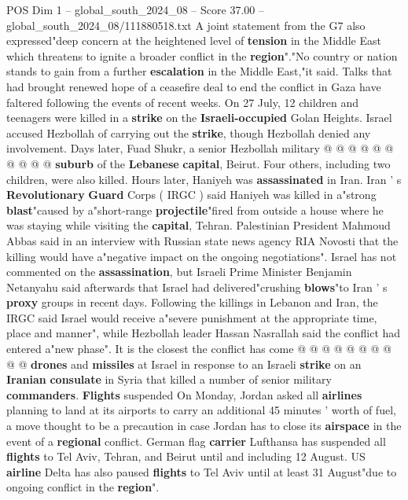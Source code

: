 \begin{textsample}{POS Dim 1 – global\_south\_2024\_08 – Score 37.00 – global\_south\_2024\_08/111880518.txt}
A joint statement from the G7 also expressed"deep concern at the heightened level of \textbf{tension} in the Middle East which threatens to ignite a broader conflict in the \textbf{region}"."No country or nation stands to gain from a further \textbf{escalation} in the Middle East,"it said.
Talks that had brought renewed hope of a ceasefire deal to end the conflict in Gaza have faltered following the events of recent weeks.
On 27 July, 12 children and teenagers were killed in a \textbf{strike} on the \textbf{Israeli-occupied} Golan Heights.
Israel accused Hezbollah of carrying out the \textbf{strike}, though Hezbollah denied any involvement.
Days later, Fuad Shukr, a senior Hezbollah military @ @ @ @ @ @ @ @ @ @ \textbf{suburb} of the \textbf{Lebanese} \textbf{capital}, Beirut.
Four others, including two children, were also killed.
Hours later, Haniyeh was \textbf{assassinated} in Iran.
Iran ' s \textbf{Revolutionary} \textbf{Guard} Corps ( IRGC ) said Haniyeh was killed in a"strong \textbf{blast}"caused by a"short-range \textbf{projectile}"fired from outside a house where he was staying while visiting the \textbf{capital}, Tehran.
Palestinian President Mahmoud Abbas said in an interview with Russian state news agency RIA Novosti that the killing would have a"negative impact on the ongoing negotiations".
Israel has not commented on the \textbf{assassination}, but Israeli Prime Minister Benjamin Netanyahu said afterwards that Israel had delivered"crushing \textbf{blows}"to Iran ' s \textbf{proxy} groups in recent days.
Following the killings in Lebanon and Iran, the IRGC said Israel would receive a"severe punishment at the appropriate time, place and manner", while Hezbollah leader Hassan Nasrallah said the conflict had entered a"new phase".
It is the closest the conflict has come @ @ @ @ @ @ @ @ @ @ \textbf{drones} and \textbf{missiles} at Israel in response to an Israeli \textbf{strike} on an \textbf{Iranian} \textbf{consulate} in Syria that killed a number of senior military \textbf{commanders}. \textbf{Flights} suspended On Monday, Jordan asked all \textbf{airlines} planning to land at its airports to carry an additional 45 minutes ' worth of fuel, a move thought to be a precaution in case Jordan has to close its \textbf{airspace} in the event of a \textbf{regional} conflict.
German flag \textbf{carrier} Lufthansa has suspended all \textbf{flights} to Tel Aviv, Tehran, and Beirut until and including 12 August.
US \textbf{airline} Delta has also paused \textbf{flights} to Tel Aviv until at least 31 August"due to ongoing conflict in the \textbf{region}".

\end{textsample}

